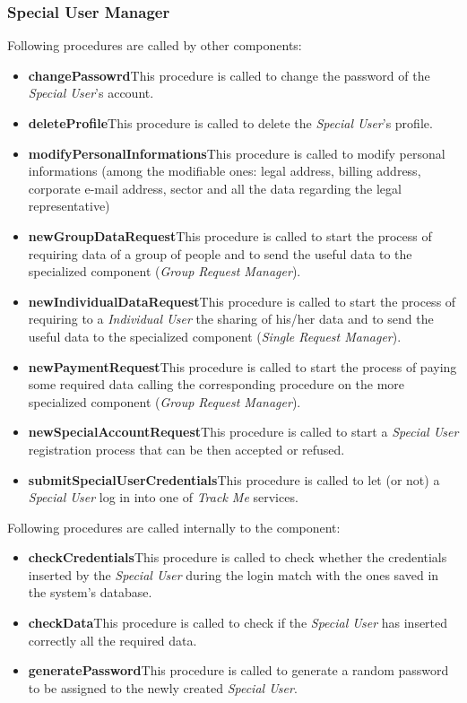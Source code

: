 \subsubsection{Special User Manager}
Following procedures are called by other components:
\begin{itemize}
  \item \textbf{changePassowrd}\quad This procedure is called to change the password of the \textit{Special User}'s account.
  \item \textbf{deleteProfile}\quad This procedure is called to delete the \textit{Special User}'s profile.
  \item \textbf{modifyPersonalInformations}\quad This procedure is called to modify personal informations (among the modifiable ones:  legal address, billing address, corporate e-mail address, sector and all the data regarding the legal representative)
  \item \textbf{newGroupDataRequest}\quad This procedure is called to start the process of requiring data of a group of people and to send the useful data to the specialized component (\textit{Group Request Manager}).
  \item \textbf{newIndividualDataRequest}\quad This procedure is called to start the process of requiring to a \textit{Individual User} the sharing of his/her data and to send the useful data to the specialized component (\textit{Single Request Manager}).
  \item \textbf{newPaymentRequest}\quad This procedure is called to start the process of paying some required data calling the corresponding procedure on the more specialized component (\textit{Group Request Manager}).
  \item \textbf{newSpecialAccountRequest}\quad This procedure is called to start a \textit{Special User} registration process that can be then accepted or refused.
  \item \textbf{submitSpecialUserCredentials}\quad This procedure is called to let (or not) a \textit{Special User} log in into one of \textit{Track Me} services.
\end{itemize}

\myparagraph{}
Following procedures are called internally to the component:
\begin{itemize}
  \item \textbf{checkCredentials}\quad This procedure is called to check whether the credentials inserted by the \textit{Special User} during the login match with the ones saved in the system's database.
  \item \textbf{checkData}\quad This procedure is called to check if the \textit{Special User} has inserted correctly all the required data.
  \item \textbf{generatePassword}\quad This procedure is called to generate a random password to be assigned to the newly created \textit{Special User}.
\end{itemize}

